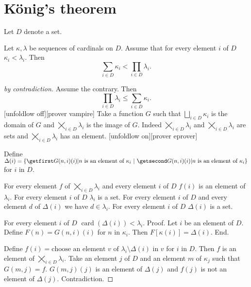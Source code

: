 \documentclass[english]{article}
\newcommand{\card}[1]{\operatorname{card}(#1)}
\newcommand{\SumSet}[2]{\bigsqcup_{i \in #2} #1_{i}}
\newcommand{\Sum}[2]{\sum_{i \in #2} #1_{i}}
\newcommand{\ProdSet}[2]{\bigtimes_{i \in #2} #1_{i}}
\newcommand{\Prod}[2]{\prod_{i \in #2} #1_{i}}
\begin{document}
\section{König's theorem}

\begin{forthel}
  Let $D$ denote a set.

  \begin{theorem}
    Let $\kappa, \lambda$ be sequences of cardinals on $D$.
    Assume that for every element $i$ of $D$ $\kappa_{i} < \lambda_{i}$.
    Then \[ \Sum{\kappa}{D} < \Prod{\lambda}{D}. \]
  \end{theorem}
  \begin{proof}[by contradiction]
    Assume the contrary.
    Then \[ \Prod{\lambda}{D} \leq \Sum{\kappa}{D}. \]
    [unfoldlow off][prover vampire]
    Take a function $G$ such that $\SumSet{\kappa}{D}$ is the domain of $G$ and
    $\ProdSet{\lambda}{D}$ is the image of $G$.
    Indeed $\ProdSet{\lambda}{D}$ and $\ProdSet{\lambda}{D}$ are sets and
    $\ProdSet{\lambda}{D}$ has an element.
    [unfoldlow on][prover eprover]

    Define $\Delta(i) = \class{G(n,i)(i) | \text{$n$ is an element of
    $\kappa_{i}$}}$ for $i$ in $D$.

    For every element $f$ of $\ProdSet{\lambda}{D}$ and every element $i$ of $D$
    $f(i)$ is an element of $\lambda_{i}$.
    For every element $i$ of $D$ $\lambda_{i}$ is a set.
    For every element $i$ of $D$ and every element $d$ of $\Delta(i)$ we have
    $d\in \lambda_{i}$.
    For every element $i$ of $D$ $\Delta(i)$ is a set.

    For every element $i$ of $D$ $\card{\Delta(i)} < \lambda_{i}$. \newline
    Proof.
      Let $i$ be an element of $D$.
      Define $F(n) = G(n,i)(i)$ for $n$ in $\kappa_{i}$.
      Then $F[\kappa(i)] = \Delta(i)$.
    End.

    Define $f(i) = \text{choose an element $v$ of $\lambda_{i} \setminus
    \Delta(i)$ in $v$}$ for $i$ in $D$.
    Then $f$ is an element of $\ProdSet{\lambda}{D}$.
    Take an element $j$ of $D$ and an element $m$ of $\kappa_{j}$ such that
    $G(m,j) = f$.
    $G(m,j)(j)$ is an element of $\Delta(j)$ and $f(j)$ is not an element of
    $\Delta(j)$.
    Contradiction.
  \end{proof}
\end{forthel}

\printbibliography
\end{document}
